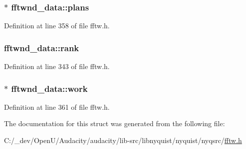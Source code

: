 \subsubsection[{\texorpdfstring{plans}{plans}}]{$\ast$ fftwnd\+\_\+data\+::plans}\hypertarget{structfftwnd__data_ae4f62c58612bb6ee7b6b2b056f7fc0a2}{}\label{structfftwnd__data_ae4f62c58612bb6ee7b6b2b056f7fc0a2}


Definition at line 358 of file fftw.\+h.

\subsubsection[{\texorpdfstring{rank}{rank}}]{ fftwnd\+\_\+data\+::rank}\hypertarget{structfftwnd__data_a45c88cd0e574357ba13a671a94ce6adb}{}\label{structfftwnd__data_a45c88cd0e574357ba13a671a94ce6adb}


Definition at line 343 of file fftw.\+h.

\subsubsection[{\texorpdfstring{work}{work}}]{$\ast$ fftwnd\+\_\+data\+::work}\hypertarget{structfftwnd__data_a5d41dc9033beffa4d941c3dae155a862}{}\label{structfftwnd__data_a5d41dc9033beffa4d941c3dae155a862}


Definition at line 361 of file fftw.\+h.



The documentation for this struct was generated from the following file\+:\begin{DoxyCompactItemize}
\item 
C\+:/\+\_\+dev/\+Open\+U/\+Audacity/audacity/lib-\/src/libnyquist/nyquist/nyqsrc/\hyperlink{fftw_8h}{fftw.\+h}\end{DoxyCompactItemize}
